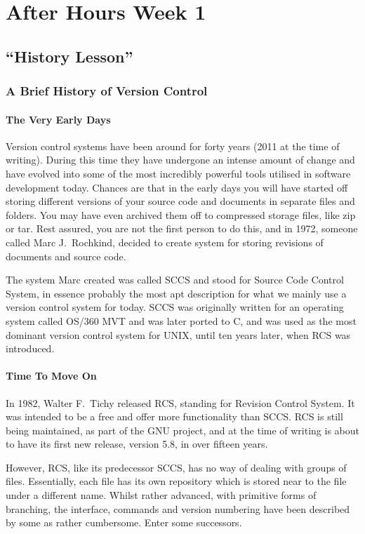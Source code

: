 \chapter{After Hours Week 1}
\section{``History Lesson''}
\subsection{A Brief History of Version Control}
\subsubsection{The Very Early Days}
Version control systems have been around for forty years (2011 at the time of writing).
During this time they have undergone an intense amount of change and have evolved into some of the most incredibly powerful tools utilised in software development today.
Chances are that in the early days you will have started off storing different versions of your source code and documents in separate files and folders.
You may have even archived them off to compressed storage files, like zip or tar.
Rest assured, you are not the first person to do this, and in 1972, someone called Marc J.\ Rochkind, decided to create system for storing revisions of documents and source code.

The system Marc created was called SCCS and stood for Source Code Control System, in essence probably the most apt description for what we mainly use a version control system for today.
SCCS was originally written for an operating system called OS/360 MVT and was later ported to C, and was used as the most dominant version control system for UNIX, until ten years later, when RCS was introduced.

\subsubsection{Time To Move On}
In 1982, Walter F.\ Tichy released RCS, standing for Revision Control System.
It was intended to be a free and offer more functionality than SCCS.
RCS is still being maintained, as part of the GNU project, and at the time of writing is about to have its first new release, version 5.8, in over fifteen years.

However, RCS, like its predecessor SCCS, has no way of dealing with groups of files.
Essentially, each file has its own repository which is stored near to the file under a different name.
Whilst rather advanced, with primitive forms of branching, the interface, commands and version numbering have been described by some as rather cumbersome.
Enter some successors.


